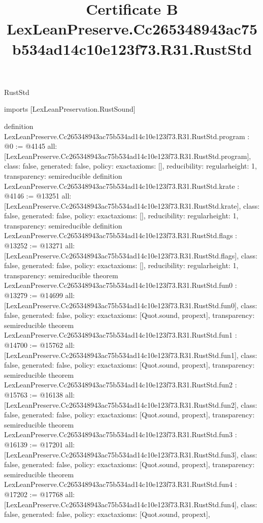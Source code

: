 \begin{lexlean}{RustStd}
\title{Certificate B LexLeanPreserve.Cc265348943ac75b534ad14c10e123f73.R31.RustStd}
\begin{coremodule}
imports [LexLeanPreservation.RustSound]

definition LexLeanPreserve.Cc265348943ac75b534ad14c10e123f73.R31.RustStd.program : @0 := @4145 {
  all: [LexLeanPreserve.Cc265348943ac75b534ad14c10e123f73.R31.RustStd.program],
  class: false,
  generated: false,
  policy: exact{axioms: []},
  reducibility: regular{height: 1},
  transparency: semireducible
}
definition LexLeanPreserve.Cc265348943ac75b534ad14c10e123f73.R31.RustStd.krate : @4146 := @13251 {
  all: [LexLeanPreserve.Cc265348943ac75b534ad14c10e123f73.R31.RustStd.krate],
  class: false,
  generated: false,
  policy: exact{axioms: []},
  reducibility: regular{height: 1},
  transparency: semireducible
}
definition LexLeanPreserve.Cc265348943ac75b534ad14c10e123f73.R31.RustStd.flags : @13252 := @13271 {
  all: [LexLeanPreserve.Cc265348943ac75b534ad14c10e123f73.R31.RustStd.flags],
  class: false,
  generated: false,
  policy: exact{axioms: []},
  reducibility: regular{height: 1},
  transparency: semireducible
}
theorem LexLeanPreserve.Cc265348943ac75b534ad14c10e123f73.R31.RustStd.fun0 : @13279 := @14699 {
  all: [LexLeanPreserve.Cc265348943ac75b534ad14c10e123f73.R31.RustStd.fun0],
  class: false,
  generated: false,
  policy: exact{axioms: [Quot.sound, propext]},
  transparency: semireducible
}
theorem LexLeanPreserve.Cc265348943ac75b534ad14c10e123f73.R31.RustStd.fun1 : @14700 := @15762 {
  all: [LexLeanPreserve.Cc265348943ac75b534ad14c10e123f73.R31.RustStd.fun1],
  class: false,
  generated: false,
  policy: exact{axioms: [Quot.sound, propext]},
  transparency: semireducible
}
theorem LexLeanPreserve.Cc265348943ac75b534ad14c10e123f73.R31.RustStd.fun2 : @15763 := @16138 {
  all: [LexLeanPreserve.Cc265348943ac75b534ad14c10e123f73.R31.RustStd.fun2],
  class: false,
  generated: false,
  policy: exact{axioms: [Quot.sound, propext]},
  transparency: semireducible
}
theorem LexLeanPreserve.Cc265348943ac75b534ad14c10e123f73.R31.RustStd.fun3 : @16139 := @17201 {
  all: [LexLeanPreserve.Cc265348943ac75b534ad14c10e123f73.R31.RustStd.fun3],
  class: false,
  generated: false,
  policy: exact{axioms: [Quot.sound, propext]},
  transparency: semireducible
}
theorem LexLeanPreserve.Cc265348943ac75b534ad14c10e123f73.R31.RustStd.fun4 : @17202 := @17768 {
  all: [LexLeanPreserve.Cc265348943ac75b534ad14c10e123f73.R31.RustStd.fun4],
  class: false,
  generated: false,
  policy: exact{axioms: [Quot.sound, propext]},
}
\end{coremodule}
\end{lexlean}

